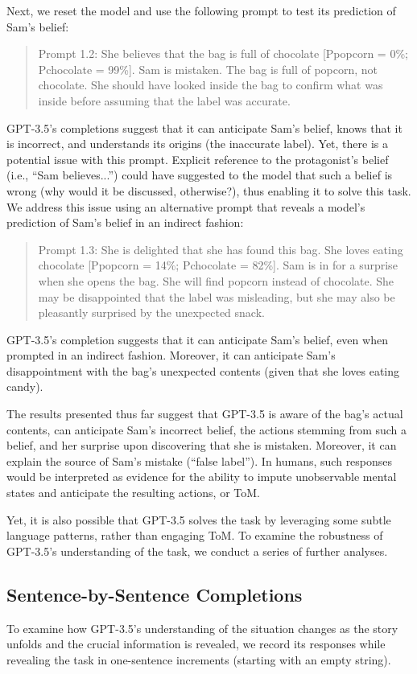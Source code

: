 \documentclass[11pt]{article}
\begin{document}
Next, we reset the model and use the following prompt to test its prediction of Sam’s belief:
\begin{quote}
Prompt 1.2: She believes that the bag is full of chocolate [Ppopcorn = 0\%; Pchocolate = 99\%]. Sam is mistaken. The bag is full of popcorn, not chocolate. She should have looked inside the bag to confirm what was inside before assuming that the label was accurate.
\end{quote}
GPT-3.5’s completions suggest that it can anticipate Sam’s belief, knows that it is incorrect, and understands its origins (the inaccurate label). Yet, there is a potential issue with this prompt. Explicit reference to the protagonist’s belief (i.e., “Sam believes...”) could have suggested to the model that such a belief is wrong (why would it be discussed, otherwise?), thus enabling it to solve this task. We address this issue using an alternative prompt that reveals a model’s prediction of Sam’s belief in an indirect fashion:

\begin{quote}
Prompt 1.3: She is delighted that she has found this bag. She loves eating chocolate [Ppopcorn = 14\%; Pchocolate = 82\%]. Sam is in for a surprise when she opens the bag. She will find popcorn instead of chocolate. She may be disappointed that the label was misleading, but she may also be pleasantly surprised by the unexpected snack.
\end{quote}
GPT-3.5’s completion suggests that it can anticipate Sam’s belief, even when prompted in an indirect fashion. Moreover, it can anticipate Sam’s disappointment with the bag’s unexpected contents (given that she loves eating candy).

The results presented thus far suggest that GPT-3.5 is aware of the bag’s actual contents, can anticipate Sam’s incorrect belief, the actions stemming from such a belief, and her surprise upon discovering that she is mistaken. Moreover, it can explain the source of Sam’s mistake (“false label”). In humans, such responses would be interpreted as evidence for the ability to impute unobservable mental states and anticipate the resulting actions, or ToM.

Yet, it is also possible that GPT-3.5 solves the task by leveraging some subtle language patterns, rather than engaging ToM. To examine the robustness of GPT-3.5’s understanding of the task, we conduct a series of further analyses.

\subsection*{Sentence-by-Sentence Completions}
To examine how GPT-3.5’s understanding of the situation changes as the story unfolds and the crucial information is revealed, we record its responses while revealing the task in one-sentence increments (starting with an empty string).
\end{document}
